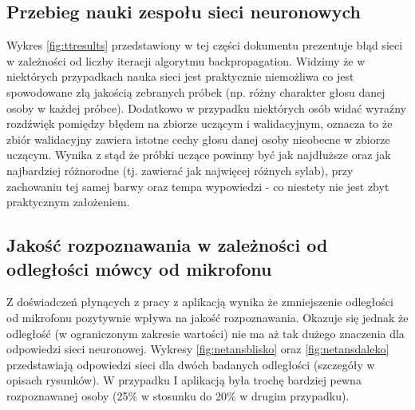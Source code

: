 \documentclass[a4paper]{article}
\begin{document}
	\subsection{Przebieg nauki zespołu sieci neuronowych}
		Wykres \ref{fig:ttresults} przedstawiony w tej części dokumentu 
		prezentuje błąd sieci w zależności od liczby iteracji
		algorytmu backpropagation. Widzimy że w niektórych przypadkach nauka sieci jest 
		praktycznie niemożliwa co jest spowodowane złą jakością zebranych próbek (np. różny
		charakter głosu danej osoby w każdej próbce). Dodatkowo w przypadku niektórych osób widać
		wyraźny rozdźwięk pomiędzy błędem na zbiorze uczącym i walidacyjnym, oznacza to że
		zbiór walidacyjny zawiera istotne cechy głosu danej osoby nieobecne w zbiorze uczącym.
		Wynika z stąd że próbki uczące powinny być jak najdłuższe oraz jak najbardziej różnorodne (tj. zawierać
		jak najwięcej różnych sylab),
		przy zachowaniu tej samej barwy oraz tempa wypowiedzi - co niestety nie jest zbyt praktycznym założeniem.
	\subsection{Jakość rozpoznawania w zależności od odległości mówcy od mikrofonu}
		Z doświadczeń płynących z pracy z aplikacją wynika że zmniejszenie odległości od mikrofonu 
		pozytywnie wpływa na jakość rozpoznawania. Okazuje się jednak że odległość (w ograniczonym zakresie
		wartości) nie ma aż tak dużego znaczenia dla odpowiedzi sieci neuronowej. Wykresy
		\ref{fig:netansblisko} oraz \ref{fig:netansdaleko} przedstawiają odpowiedzi sieci dla dwóch badanych
		odległości (szczegóły w opisach rysunków). W przypadku I aplikacją była trochę bardziej pewna rozpoznawanej
		osoby (25\% w stosunku do 20\% w drugim przypadku).
	 
		\clearpage
		\newpage	
		\thispagestyle{empty}
		\addtolength{\voffset}{-105pt}
	
\end{document}
